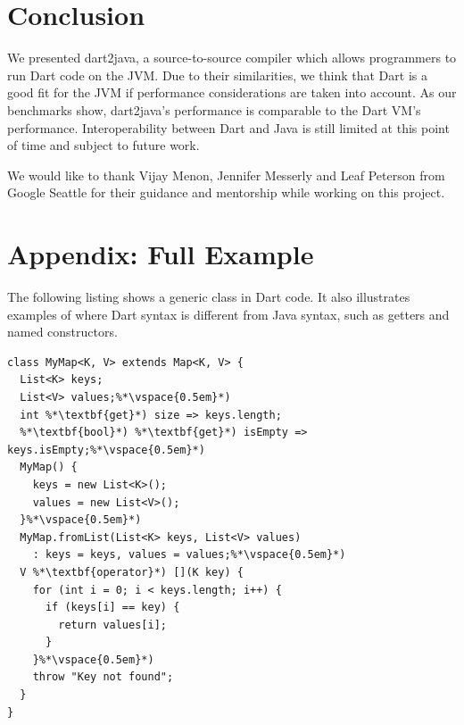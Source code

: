 \documentclass[sigplan]{acmart}
\begin{document}
\section{Conclusion}
We presented dart2java, a source-to-source compiler which allows programmers to run Dart code on the JVM.  Due to their similarities, we think that Dart is a good fit for the JVM if performance considerations are taken into account. As our benchmarks show, dart2java's performance is comparable to the Dart VM's performance. Interoperability between Dart and Java is still limited at this point of time and subject to future work.

\begin{acks} 
We would like to thank Vijay Menon, Jennifer Messerly and Leaf Peterson from Google Seattle for their guidance and mentorship while working on this project. 
\end{acks}






\appendix
\section{Appendix: Full Example}
The following listing shows a generic class in Dart code. It also  illustrates examples of where Dart syntax is different from Java syntax, such as getters and named constructors.

\begin{mdframed}[outerlinewidth=0.1pt,outerlinecolor=black,skipabove=4pt,
  innerleftmargin=5pt,innerrightmargin=0pt,innertopmargin=0pt,innerbottommargin=0pt]
\begin{lstlisting}[basicstyle=\scriptsize\ttfamily]
class MyMap<K, V> extends Map<K, V> {
  List<K> keys;
  List<V> values;%*\vspace{0.5em}*)
  int %*\textbf{get}*) size => keys.length;
  %*\textbf{bool}*) %*\textbf{get}*) isEmpty => keys.isEmpty;%*\vspace{0.5em}*)
  MyMap() {
    keys = new List<K>();
    values = new List<V>();
  }%*\vspace{0.5em}*)
  MyMap.fromList(List<K> keys, List<V> values) 
    : keys = keys, values = values;%*\vspace{0.5em}*)
  V %*\textbf{operator}*) [](K key) {
    for (int i = 0; i < keys.length; i++) {
      if (keys[i] == key) {
        return values[i];
      }
    }%*\vspace{0.5em}*)
    throw "Key not found";
  }
}
\end{lstlisting}
\end{mdframed}
\end{document}
